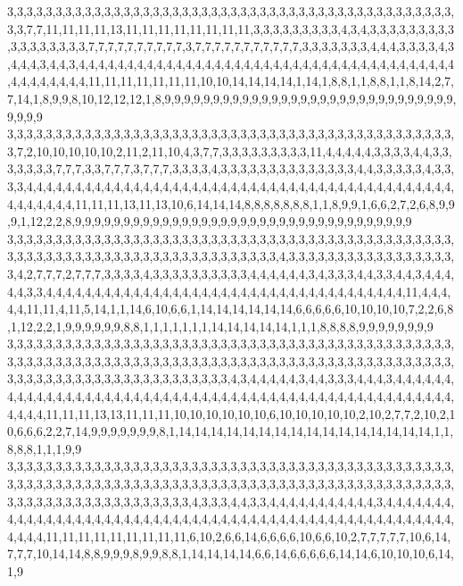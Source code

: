 3,3,3,3,3,3,3,3,3,3,3,3,3,3,3,3,3,3,3,3,3,3,3,3,3,3,3,3,3,3,3,3,3,3,3,3,3,3,3,3,3,3,3,3,3,3,3,3,7,7,11,11,11,11,13,11,11,11,11,11,11,11,11,3,3,3,3,3,3,3,3,3,4,3,4,3,3,3,3,3,3,3,3,3,3,3,3,3,3,3,3,3,7,7,7,7,7,7,7,7,7,7,3,7,7,7,7,7,7,7,7,7,7,7,3,3,3,3,3,3,3,4,4,4,3,3,3,3,4,3,4,4,4,3,4,4,3,4,4,4,4,4,4,4,4,4,4,4,4,4,4,4,4,4,4,4,4,4,4,4,4,4,4,4,4,4,4,4,4,4,4,4,4,4,4,4,4,4,4,4,4,4,4,4,11,11,11,11,11,11,11,10,10,14,14,14,14,1,14,1,8,8,1,1,8,8,1,1,8,14,2,7,7,14,1,8,9,9,8,10,12,12,12,1,8,9,9,9,9,9,9,9,9,9,9,9,9,9,9,9,9,9,9,9,9,9,9,9,9,9,9,9,9,9,9,9,9,9,9
3,3,3,3,3,3,3,3,3,3,3,3,3,3,3,3,3,3,3,3,3,3,3,3,3,3,3,3,3,3,3,3,3,3,3,3,3,3,3,3,3,3,3,3,3,3,3,7,2,10,10,10,10,10,2,11,2,11,10,4,3,7,7,3,3,3,3,3,3,3,3,3,11,4,4,4,4,4,3,3,3,3,4,4,3,3,3,3,3,3,3,7,7,7,3,3,7,7,7,3,7,7,7,3,3,3,3,4,3,3,3,3,3,3,3,3,3,3,3,3,3,3,4,4,3,3,3,3,3,4,3,3,3,3,4,4,4,4,4,4,4,4,4,4,4,4,4,4,4,4,4,4,4,4,4,4,4,4,4,4,4,4,4,4,4,4,4,4,4,4,4,4,4,4,4,4,4,4,4,4,4,4,4,4,4,11,11,11,13,11,13,10,6,14,14,14,8,8,8,8,8,8,8,1,1,8,9,9,1,6,6,2,7,2,6,8,9,9,9,1,12,2,2,8,9,9,9,9,9,9,9,9,9,9,9,9,9,9,9,9,9,9,9,9,9,9,9,9,9,9,9,9,9,9,9,9,9,9,9
3,3,3,3,3,3,3,3,3,3,3,3,3,3,3,3,3,3,3,3,3,3,3,3,3,3,3,3,3,3,3,3,3,3,3,3,3,3,3,3,3,3,3,3,3,3,3,3,3,3,3,3,3,3,3,3,3,3,3,3,3,3,3,3,3,3,3,3,3,3,3,3,3,3,4,3,3,3,3,3,3,3,3,3,3,3,3,3,3,3,3,3,3,4,2,7,7,7,2,7,7,7,3,3,3,3,4,3,3,3,3,3,3,3,3,3,3,4,4,4,4,4,4,3,4,3,3,3,4,4,3,3,4,4,3,4,4,4,4,4,3,3,4,4,4,4,4,4,4,4,4,4,4,4,4,4,4,4,4,4,4,4,4,4,4,4,4,4,4,4,4,4,4,4,4,4,4,4,4,11,4,4,4,4,4,11,11,4,11,5,14,1,1,14,6,10,6,6,1,14,14,14,14,14,14,6,6,6,6,6,10,10,10,10,7,2,2,6,8,1,12,2,2,1,9,9,9,9,9,9,8,8,1,1,1,1,1,1,1,14,14,14,14,14,1,1,1,8,8,8,8,9,9,9,9,9,9,9,9
3,3,3,3,3,3,3,3,3,3,3,3,3,3,3,3,3,3,3,3,3,3,3,3,3,3,3,3,3,3,3,3,3,3,3,3,3,3,3,3,3,3,3,3,3,3,3,3,3,3,3,3,3,3,3,3,3,3,3,3,3,3,3,3,3,3,3,3,3,3,3,3,3,3,3,3,3,3,3,3,3,3,3,3,3,3,3,3,3,3,3,3,3,3,3,3,3,3,3,3,3,3,3,3,3,3,3,3,3,3,3,3,3,3,3,4,3,4,4,4,4,4,3,4,4,3,3,3,4,4,4,3,4,4,4,4,4,4,4,4,4,4,4,4,4,4,4,4,4,4,4,4,4,4,4,4,4,4,4,4,4,4,4,4,4,4,4,4,4,4,4,4,4,4,4,4,4,4,4,4,4,4,4,4,4,4,4,4,11,11,11,13,13,11,11,11,10,10,10,10,10,10,6,10,10,10,10,10,2,10,2,7,7,2,10,2,10,6,6,6,2,2,7,14,9,9,9,9,9,9,9,8,1,14,14,14,14,14,14,14,14,14,14,14,14,14,14,14,14,1,1,8,8,8,1,1,1,9,9
3,3,3,3,3,3,3,3,3,3,3,3,3,3,3,3,3,3,3,3,3,3,3,3,3,3,3,3,3,3,3,3,3,3,3,3,3,3,3,3,3,3,3,3,3,3,3,3,3,3,3,3,3,3,3,3,3,3,3,3,3,3,3,3,3,3,3,3,3,3,3,3,3,3,3,3,3,3,3,3,3,3,3,3,3,3,3,3,3,3,3,3,3,3,3,3,3,3,3,3,3,3,3,3,3,3,3,3,3,3,3,4,3,3,3,4,4,3,3,4,4,4,4,4,4,4,4,4,4,4,3,4,4,4,4,4,4,4,4,4,4,4,4,4,4,4,4,4,4,4,4,4,4,4,4,4,4,4,4,4,4,4,4,4,4,4,4,4,4,4,4,4,4,4,4,4,4,4,4,4,4,4,4,4,4,4,4,4,11,11,11,11,11,11,11,11,11,6,10,2,6,6,14,6,6,6,6,10,6,6,10,2,7,7,7,7,7,10,6,14,7,7,7,10,14,14,8,8,9,9,9,8,9,9,8,8,1,14,14,14,14,6,6,14,6,6,6,6,6,14,14,6,10,10,10,6,14,1,9

